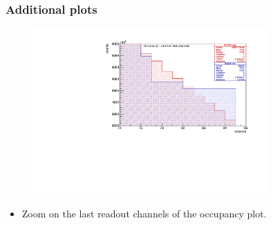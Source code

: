\documentclass{beamer}
\begin{document}
\begin{frame}



    \frametitle{Additional plots}
    \begin{figure}[!h]
        \centering
        \includegraphics[width =0.8\textwidth]{figures/pdf/figure_00014_nhitsvschannel_roc_simulation_281.pdf}
        \label{fig:anglesinmuon}
    \end{figure}
    \begin{itemize}
        \item Zoom on the last readout channels of the occupancy plot.
    \end{itemize}
\end{frame}
\end{document}
